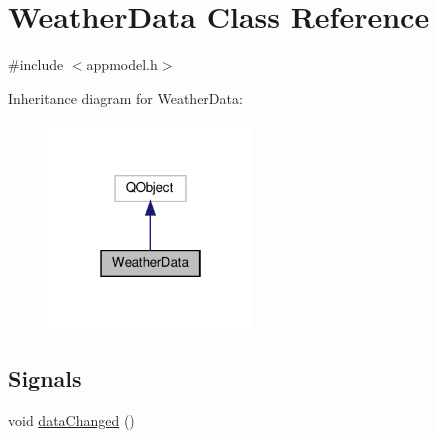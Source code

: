 \hypertarget{class_weather_data}{}\section{Weather\+Data Class Reference}
\label{class_weather_data}


{\ttfamily \#include $<$appmodel.\+h$>$}



Inheritance diagram for Weather\+Data\+:\nopagebreak
\begin{figure}[H]
\begin{center}
\leavevmode
\includegraphics[width=154pt]{class_weather_data__inherit__graph}
\end{center}
\end{figure}
\subsection*{Signals}
\begin{DoxyCompactItemize}
\item 
void \hyperlink{class_weather_data_a23185106cf22ef8c57c96154e37b24d1}{data\+Changed} ()
\end{DoxyCompactItemize}
